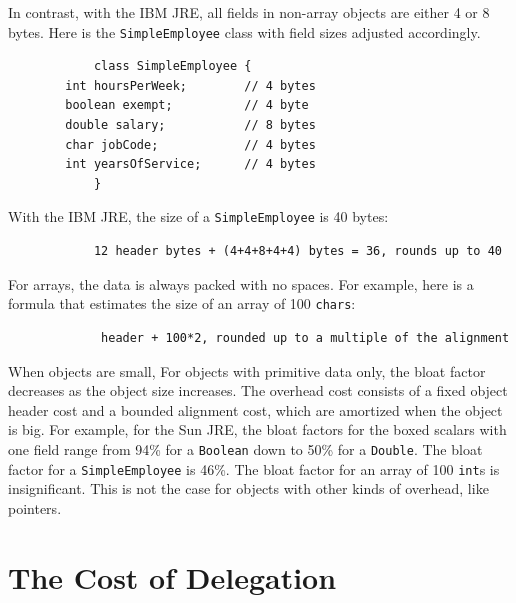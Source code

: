 In contrast, with the IBM JRE, all fields in non-array objects are either 4 or 8 bytes.  Here is the \texttt{SimpleEmployee} class with field sizes adjusted accordingly. 
\ttfamily
\begin{verbatim} 
			class SimpleEmployee {
        int hoursPerWeek;        // 4 bytes
        boolean exempt;          // 4 byte
        double salary;           // 8 bytes
        char jobCode;            // 4 bytes
        int yearsOfService;      // 4 bytes
			}
\end{verbatim}
\normalfont
With the IBM JRE, the size of a \texttt{SimpleEmployee} is 40 bytes:
\begin{verbatim}
            12 header bytes + (4+4+8+4+4) bytes = 36, rounds up to 40
\end{verbatim}
For arrays, the data is always packed with no spaces. For example, here is a formula that estimates the size of an array of 100 \texttt{chars}:
\begin{verbatim}
             header + 100*2, rounded up to a multiple of the alignment
\end{verbatim}

When objects are small, For objects with primitive data only, the bloat factor decreases as the object size increases. The overhead cost consists of a fixed object header cost and a bounded alignment cost, which are amortized when the object is big.  For example, for the Sun JRE, the bloat factors for the boxed scalars with one field range from 94\% for a \texttt{Boolean} down to 50\% for a \texttt{Double}.  The bloat factor for a \texttt{SimpleEmployee} is 46\%.  The bloat factor for an array of 100 \texttt{int}s is insignificant. This is not the case for objects with other kinds of overhead, like pointers.

\section{The Cost of Delegation}

